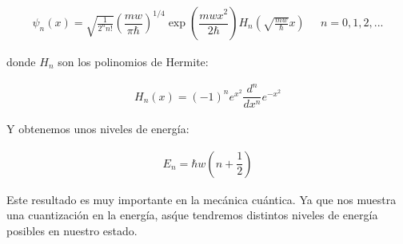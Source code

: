  \begin{align}
\psi_n(x)=\sqrt{\frac{1}{2^n n!}} (\dfrac{mw}{\pi\hbar})^{1/4}\exp(\dfrac{mwx^2}{2\hbar})H_n(\sqrt{\frac{mw}{\hbar}}x) \,\,\,\,\,\,\,\ n=0,1,2,...
\label{eq:sol_schr}
\end{align}

donde $H_n$ son los polinomios de Hermite:

\begin{align}
H_n(x)=(-1)^n e^{x^2} \dfrac{d^n}{dx^n}e^{-x^2}
\label{eq:herm}
\end{align}

Y obtenemos unos niveles de energ\'ia:

\begin{align}
E_n=\hbar w(n+\dfrac{1}{2})
\label{eq:energ}
\end{align}

Este resultado es muy importante en la mec\'anica cu\'antica. Ya que nos muestra una cuantizaci\'on en la energ\'ia, as\' que tendremos distintos niveles de energ\'ia posibles en nuestro estado.
\pagebreak
